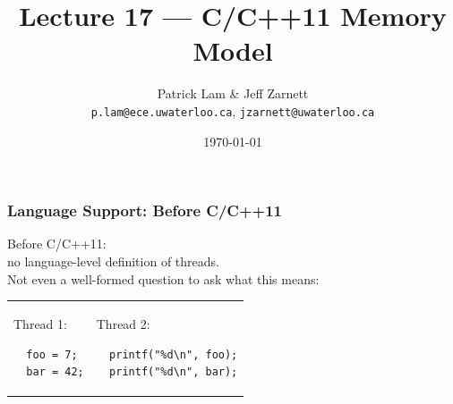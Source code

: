 

\title{Lecture 17 --- C/C++11 Memory Model }

\author{Patrick Lam \& Jeff Zarnett \\ \small \texttt{p.lam@ece.uwaterloo.ca}, \texttt{jzarnett@uwaterloo.ca}}
\date{\today}




\begin{frame}
  \titlepage

 \end{frame}

\begin{frame}[fragile]
  \frametitle{Language Support: Before C/C++11}


  
    Before C/C++11: \\ \qquad no language-level definition of threads.\\[1em]

    Not even a well-formed question to ask what this means:\\[.5em]
    \begin{tabular}{ll}
      \begin{minipage}{.2\textwidth}
        Thread 1:
        \begin{lstlisting}
  foo = 7;
  bar = 42;
        \end{lstlisting}
      \end{minipage} &
      \begin{minipage}{.4\textwidth}
        Thread 2:
        \begin{lstlisting}
  printf("%d\n", foo);
  printf("%d\n", bar);
        \end{lstlisting}
      \end{minipage}
    \end{tabular}
    ~\\[1em]
    
  
\end{frame}

